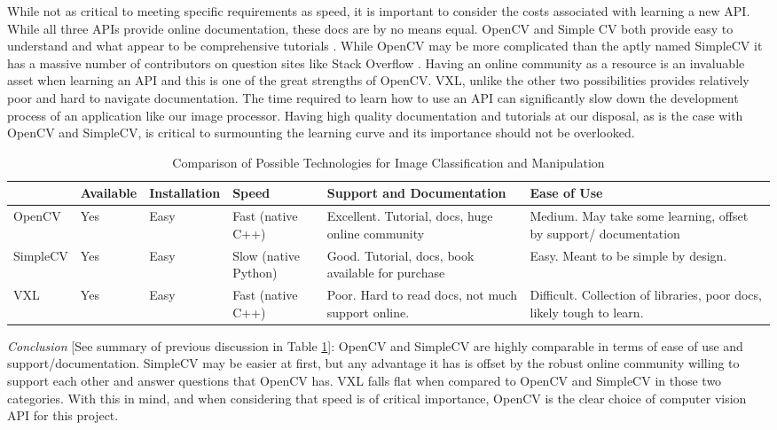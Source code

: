 \documentclass[10pt, onecolumn, draftclsnofoot, letterpaper, compsoc]{IEEEtran}
\begin{document}
While not as critical to meeting specific requirements as speed, it is important
to consider the costs associated with learning a new API. While all three APIs
provide online documentation, these docs are by no means equal. OpenCV and
Simple CV both provide easy to understand and what appear to be comprehensive
tutorials \cite{OCV, SCV}. While OpenCV may be more complicated than the aptly
named SimpleCV it has a massive number of contributors on question sites like
Stack Overflow \cite{stkovrflw}. Having an online community as a resource is an
invaluable asset when learning an API and this is one of the great strengths of
OpenCV. VXL, unlike the other two possibilities provides relatively poor and
hard to navigate documentation. The time required to learn how to use an API can
significantly slow down the development process of an application like our image
processor. Having high quality documentation and tutorials at our disposal, as
is the case with OpenCV and SimpleCV, is critical to surmounting the learning
curve and its importance should not be overlooked. \\

\begin{table}[h]
\centering
\caption{Comparison of Possible Technologies for Image Classification and Manipulation}
\begin{tabular}{|p{2.1cm}|p{2.1cm}|p{2.1cm}|p{2.1cm}|p{2.1cm}|p{2.1cm}|}
\cline{4-4}

\hline  & Available & Installation & Speed & Support and Documentation & Ease of
Use  \\ \hline

OpenCV  & Yes & Easy & Fast (native C++) &  Excellent. Tutorial, docs, huge
online community & Medium. May take some learning, offset by support/
documentation  \\ \hline

SimpleCV & Yes & Easy & Slow (native Python) & Good. Tutorial, docs, book
available for purchase & Easy. Meant to be simple by design.  \\ \hline

VXL & Yes & Easy & Fast (native C++) & Poor. Hard to read docs, not much support
online. & Difficult. Collection of libraries, poor docs, likely tough to learn.
\\ \hline

\end{tabular}
\label{table:george1}
\end{table}

\textit{Conclusion} [See summary of previous discussion in Table
\ref{table:george1}]: OpenCV and SimpleCV are highly comparable in terms of ease
of use and support/documentation. SimpleCV may be easier at first, but any
advantage it has is offset by the robust online community willing to support
each other and answer questions that OpenCV has. VXL falls flat when compared to
OpenCV and SimpleCV in those two categories. With this in mind, and when
considering that speed is of critical importance, OpenCV is the clear choice of
computer vision API for this project. \\
\end{document}
